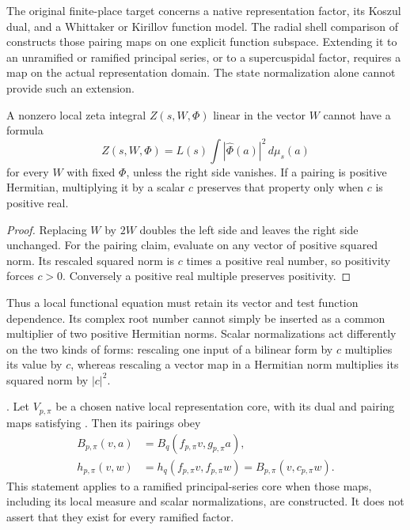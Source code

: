 The original finite-place target concerns a native representation
factor, its Koszul dual, and a Whittaker or Kirillov function model.
The radial shell comparison of
 constructs those
pairing maps on one explicit function subspace. Extending it to
an unramified or ramified principal series, or to a supercuspidal
factor, requires a map on the actual representation domain.
The state normalization alone cannot provide such an extension.

\begin{lemma}
\label{v4-arith:kms-gns:lem:GJ-ramified}
A nonzero local zeta integral $Z(s,W,\Phi)$ linear in the vector
$W$ cannot have a formula
\begin{equation}
 Z(s,W,\Phi)=L(s)\int|\widehat\Phi(a)|^2\,d\mu_s(a)
 \label{v4-arith:kms-gns:eq:GJ-ramified}
\end{equation}
for every $W$ with fixed $\Phi$, unless the right side vanishes.
If a pairing is positive Hermitian, multiplying it by a scalar
$c$ preserves that property only when $c$ is positive real.
\end{lemma}

\begin{proof}
Replacing $W$ by $2W$ doubles the left side and leaves the
right side unchanged. For the pairing claim, evaluate on any
vector of positive squared norm. Its rescaled squared norm is
$c$ times a positive real number, so positivity forces
$c>0$. Conversely a positive real multiple preserves positivity.
\end{proof}

Thus a local functional equation must retain its vector and test
function dependence. Its complex root number cannot simply be
inserted as a common multiplier of two positive Hermitian norms.
Scalar normalizations act differently on the two kinds of forms:
rescaling one input of a bilinear form by $c$ multiplies its value
by $c$, whereas rescaling a vector map in a Hermitian norm
multiplies its squared norm by $|c|^2$.

\begin{proposition}
\label{v4-arith:kms-gns:lem:Koszul-ramified}
\label{v4-arith:kms-gns:lem:Pet-ramified}
\label{v4-arith:kms-gns:prop:local-match-ramified}
\ClaimStatusProvedHereConditional. Let $V_{p,\pi}$ be a chosen
native local representation core, with its dual and pairing
maps satisfying .
Then its pairings obey
\begin{align}
 B_{p,\pi}(v,a)&=B_q(f_{p,\pi}v,g_{p,\pi}a),
    \label{v4-arith:kms-gns:eq:Koszul-ramified}\\
 h_{p,\pi}(v,w)&=h_q(f_{p,\pi}v,f_{p,\pi}w)
                =B_{p,\pi}(v,c_{p,\pi}w).
    \label{v4-arith:kms-gns:eq:Pet-ramified}
\end{align}
This statement applies to a ramified principal-series core when
those maps, including its local measure and scalar normalizations,
are constructed. It does not assert that they exist for every
ramified factor.
\end{proposition}

